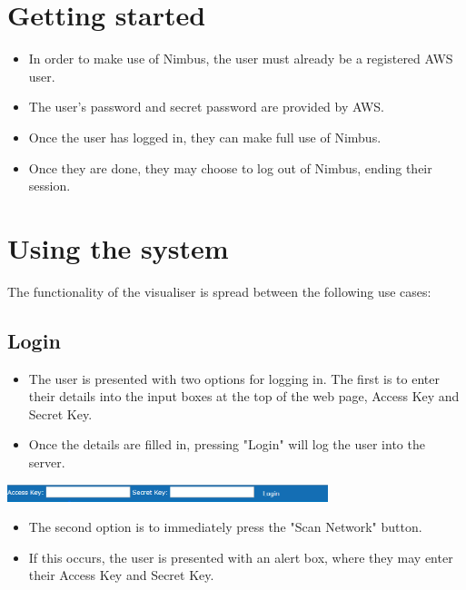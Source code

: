 \documentclass[hidelinks,a4paper,12pt]{article}
\begin{document}
\newpage

\section{Getting started}
	\begin {itemize}
		\item In order to make use of Nimbus, the user must already be a registered AWS user.
		\item The user's password and secret password are provided by AWS.
		\item Once the user has logged in, they can make full use of Nimbus.
		\item Once they are done, they may choose to log out of Nimbus, ending their session.
	\end{itemize}

\newpage

\section{Using the system}
The functionality of the visualiser is spread between the following use cases:

	\subsection{Login}
		\begin {itemize}
			\item The user is presented with two options for logging in. The first is to enter their details into the input boxes at the top of the web page, Access Key and Secret Key.
			\item Once the details are filled in, pressing "Login" will log the user into the server.
		\end{itemize}
		
  		\begin{center}
    			\includegraphics[width=0.7\textwidth]{./images/LoginOne.png}
  		\end{center}

		\begin {itemize}
		\item The second option is to immediately press the  "Scan Network" button.
		\item If this occurs, the user is presented with an alert box, where they may enter their Access Key and Secret Key.
		\end{itemize}
		
\end{document}
